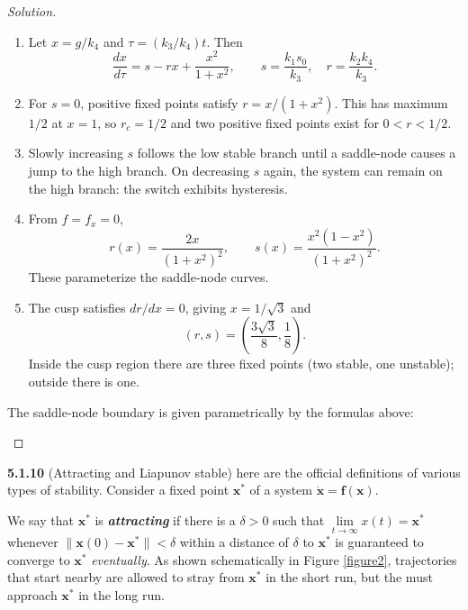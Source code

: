 \documentclass[10pt]{amsart}
\newenvironment{solution}
{\begin{proof}[Solution]}
{\end{proof}}
\begin{document}
\begin{onehalfspace}
        \begin{solution}
\begin{enumerate}[label=(\alph*)]
\item Let $x=g/k_4$ and $\tau=(k_3/k_4)t$. Then
\[\frac{dx}{d\tau}=s-rx+\frac{x^2}{1+x^2},\qquad s=\frac{k_1s_0}{k_3},\quad r=\frac{k_2k_4}{k_3}.\]
\item For $s=0$, positive fixed points satisfy $r=x/(1+x^2)$. This has maximum $1/2$ at $x=1$, so $r_c=1/2$ and two positive fixed points exist for $0<r<1/2$.
\item Slowly increasing $s$ follows the low stable branch until a saddle-node causes a jump to the high branch. On decreasing $s$ again, the system can remain on the high branch: the switch exhibits hysteresis.
\item From $f=f_x=0$,
\[r(x)=\frac{2x}{(1+x^2)^2},\qquad s(x)=\frac{x^2(1-x^2)}{(1+x^2)^2}.\]
These parameterize the saddle-node curves.
\item The cusp satisfies $dr/dx=0$, giving $x=1/\sqrt3$ and
\[(r,s)=\left(\frac{3\sqrt3}{8},\frac18\right).\]
Inside the cusp region there are three fixed points (two stable, one unstable); outside there is one.
\end{enumerate}

\medskip
The saddle-node boundary is given parametrically by the formulas above:
\begin{center}
\end{center}

\end{solution}

        \noindent\textbf{5.1.10} (Attracting and Liapunov stable) here are the official definitions of various
        types of stability.
        Consider a fixed point $\mathbf{x^*}$ of a system $\mathbf{\dot{x} = f(x)}$.

        \noindent We say that $\mathbf{x^*}$ is \textbf{\emph{attracting}} if there is a $\delta >0$ such that
        $\lim\limits_{t\rightarrow\infty} x(t) = \mathbf{x^*}$ whenever $\|\mathbf{x}(0) - \mathbf{x^*}\| < \delta$
        within a distance of $\delta$ to $\mathbf{x^*}$ is guaranteed to converge to $\mathbf{x^*}$ \emph{eventually}.
        As shown schematically in Figure \ref{figure2}, trajectories that start nearby are allowed to stray from
        $\mathbf{x^*}$ in the short run, but the must approach $\mathbf{x^*}$ in the long run.


\end{onehalfspace}
\end{document}
